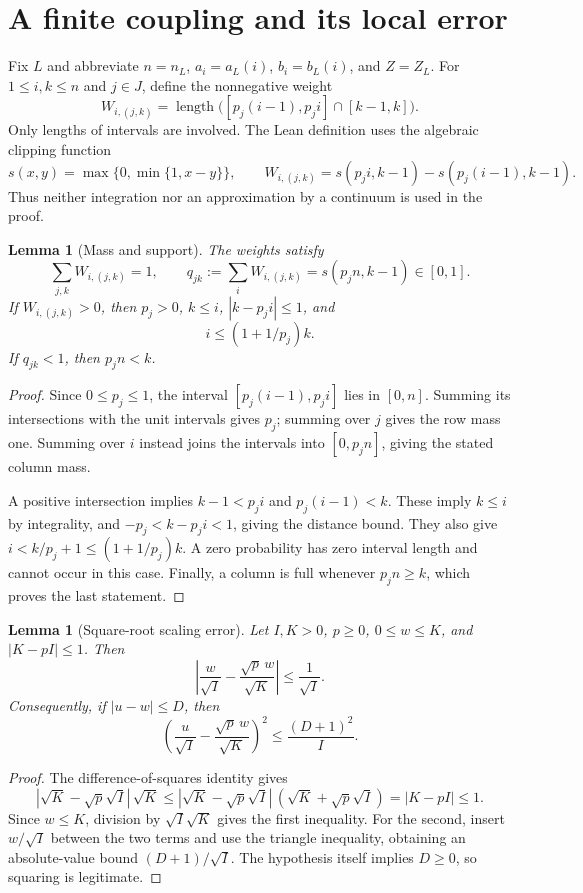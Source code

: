 \documentclass[11pt]{article}
\newtheorem{lemma}[theorem]{Lemma}
\begin{document}
\section{A finite coupling and its local error}

Fix $L$ and abbreviate $n=n_L$, $a_i=a_L(i)$, $b_i=b_L(i)$, and $Z=Z_L$. For $1\leq i,k\leq n$ and $j\in J$, define the nonnegative weight
\begin{equation}
 W_{i,(j,k)}=
 \operatorname{length}\bigl([p_j(i-1),p_ji]\cap[k-1,k]\bigr).
 \label{eq:coupling}
\end{equation}
Only lengths of intervals are involved. The Lean definition uses the algebraic clipping function
\[
 s(x,y)=\max\{0,\min\{1,x-y\}\},\qquad
 W_{i,(j,k)}=s(p_ji,k-1)-s(p_j(i-1),k-1).
\]
Thus neither integration nor an approximation by a continuum is used in the proof.

\begin{lemma}[Mass and support]\label{lem:coupling}
The weights satisfy
\[
 \sum_{j,k}W_{i,(j,k)}=1,
 \qquad q_{jk}:=\sum_iW_{i,(j,k)}=s(p_jn,k-1)\in[0,1].
\]
If $W_{i,(j,k)}>0$, then $p_j>0$, $k\leq i$, $|k-p_ji|\leq1$, and
\[
 i\leq(1+1/p_j)k.
\]
If $q_{jk}<1$, then $p_jn<k$.
\end{lemma}
\begin{proof}
Since $0\leq p_j\leq1$, the interval $[p_j(i-1),p_ji]$ lies in $[0,n]$. Summing its intersections with the unit intervals gives $p_j$; summing over $j$ gives the row mass one. Summing over $i$ instead joins the intervals into $[0,p_jn]$, giving the stated column mass.

A positive intersection implies $k-1<p_ji$ and $p_j(i-1)<k$. These imply $k\leq i$ by integrality, and $-p_j<k-p_ji<1$, giving the distance bound. They also give $i<k/p_j+1\leq(1+1/p_j)k$. A zero probability has zero interval length and cannot occur in this case. Finally, a column is full whenever $p_jn\geq k$, which proves the last statement.
\end{proof}

\begin{lemma}[Square-root scaling error]\label{lem:scalar}
Let $I,K>0$, $p\geq0$, $0\leq w\leq K$, and $|K-pI|\leq1$. Then
\[
 \left|\frac{w}{\sqrt I}-\frac{\sqrt p\,w}{\sqrt K}\right|
 \leq\frac1{\sqrt I}.
\]
Consequently, if $|u-w|\leq D$, then
\begin{equation}
 \left(\frac{u}{\sqrt I}-\frac{\sqrt p\,w}{\sqrt K}\right)^2
 \leq\frac{(D+1)^2}{I}.
 \label{eq:scalar}
\end{equation}
\end{lemma}
\begin{proof}
The difference-of-squares identity gives
\[
 |\sqrt K-\sqrt p\sqrt I|\,\sqrt K
 \leq |\sqrt K-\sqrt p\sqrt I|\,(\sqrt K+\sqrt p\sqrt I)
 =|K-pI|\leq1.
\]
Since $w\leq K$, division by $\sqrt I\sqrt K$ gives the first inequality. For the second, insert $w/\sqrt I$ between the two terms and use the triangle inequality, obtaining an absolute-value bound $(D+1)/\sqrt I$. The hypothesis itself implies $D\geq0$, so squaring is legitimate.
\end{proof}
\end{document}
